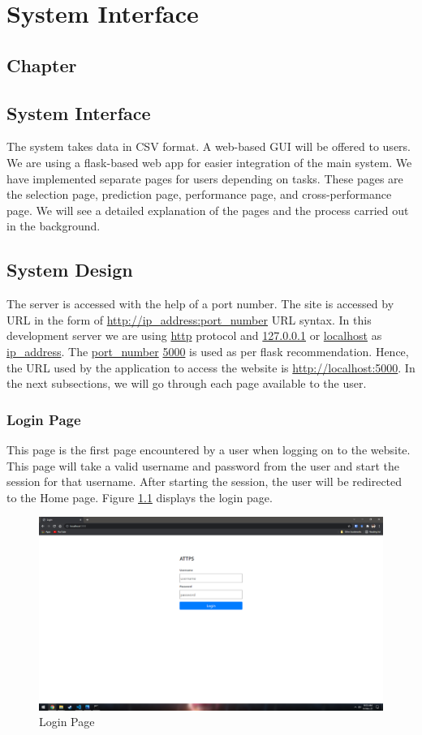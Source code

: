 \thispagestyle{fancy}
\chapter{System Interface} \label{ch:system_interface}
\section*{\centering Chapter \thechapter}
\section*{\centering System Interface}

The system takes data in CSV format. A web-based GUI will be offered to users. We are using a flask-based web app for easier integration of the main system. We have implemented separate pages for users depending on tasks. These pages are the selection page, prediction page, performance page, and cross-performance page. We will see a detailed explanation of the pages and the process carried out in the background.

\section{System Design} \label{sec:system_design}

The server is accessed with the help of a port number. The site is accessed by URL in the form of \url{http://ip_address:port_number} URL syntax. In this development server we are using \url{http} protocol and \url{127.0.0.1} or \url{localhost} as \url{ip_address}. The \url{port_number} \url{5000} is used as per flask recommendation. Hence, the URL used by the application to access the website is \url{http://localhost:5000}. In the next subsections, we will go through each page available to the user.

\subsection{Login Page} \label{subsec:login_page}
This page is the first page encountered by a user when logging on to the website. This page will take a valid username and password from the user and start the session for that username. After starting the session, the user will be redirected to the Home page. Figure \ref{fig:web_login_page} displays the login page.

\begin{figure}[H]
  \centering
  \includegraphics[width=0.7\columnwidth]{media/website/pages/00_login.png}
  \caption{Login Page}
  \label{fig:web_login_page}
\end{figure}

